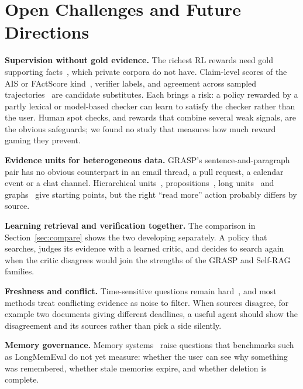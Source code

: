 \documentclass[pdflatex,sn-mathphys-num]{sn-jnl}%
\begin{document}
\section{Open Challenges and Future Directions}
\label{sec:challenges}

\textbf{Supervision without gold evidence.} The richest RL rewards need gold supporting facts~\cite{gandhi2026grasp,luo2025maragr1}, which private corpora do not have. Claim-level scores of the AIS or FActScore kind~\cite{rashkin2023ais,min2023factscore}, verifier labels, and agreement across sampled trajectories~\cite{manakul2023selfcheckgpt} are candidate substitutes. Each brings a risk: a policy rewarded by a partly lexical or model-based checker can learn to satisfy the checker rather than the user. Human spot checks, and rewards that combine several weak signals, are the obvious safeguards; we found no study that measures how much reward gaming they prevent.

\textbf{Evidence units for heterogeneous data.} GRASP's sentence-and-paragraph pair has no obvious counterpart in an email thread, a pull request, a calendar event or a chat channel. Hierarchical units~\cite{sarthi2024raptor,du2026arag}, propositions~\cite{chen2024densex}, long units~\cite{jiang2024longrag} and graphs~\cite{edge2024graphrag,gutierrez2024hipporag} give starting points, but the right ``read more'' action probably differs by source.

\textbf{Learning retrieval and verification together.} The comparison in Section~\ref{sec:compare} shows the two developing separately. A policy that searches, judges its evidence with a learned critic, and decides to search again when the critic disagrees would join the strengths of the GRASP and Self-RAG families.

\textbf{Freshness and conflict.} Time-sensitive questions remain hard~\cite{vu2024freshllms}, and most methods treat conflicting evidence as noise to filter. When sources disagree, for example two documents giving different deadlines, a useful agent should show the disagreement and its sources rather than pick a side silently.

\textbf{Memory governance.} Memory systems~\cite{packer2023memgpt,zhong2024memorybank,chhikara2025mem0,xu2025amem} raise questions that benchmarks such as LongMemEval do not yet measure: whether the user can see why something was remembered, whether stale memories expire, and whether deletion is complete.
\end{document}
